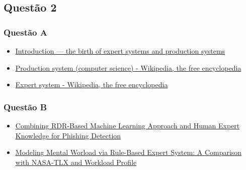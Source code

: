 \documentclass{article}
\begin{document}
    \subsection*{Questão 2}
    \subsubsection*{Questão A}
    \begin{itemize}
        \item \href{http://www.j-paine.org/students/tutorials/ps/node1.html}{Introduction --- the birth of expert systems and production systems}
        \item \href{https://en.wikipedia.org/wiki/Production_system_(computer_science)}{Production system (computer science) - Wikipedia, the free encyclopedia}
        \item \href{https://en.wikipedia.org/wiki/Expert_system}{Expert system - Wikipedia, the free encyclopedia}
    \end{itemize}
    
    \subsubsection*{Questão B}
    \begin{itemize}
        \item \href{https://books.google.com.br/books?id=GS7RDAAAQBAJ&lpg=PA80&dq=artificial%20intelligence%20expert%20system%202016&hl=pt-BR&pg=PA80#v=onepage&q=artificial%20intelligence%20expert%20system%202016&f=false}{Combining RDR-Based Machine Learning Approach and Human Expert Knowledge for Phishing Detection}
        \item \href{https://books.google.com.br/books?id=jYb2DAAAQBAJ&lpg=PA215&dq=artificial%20intelligence%20expert%20system%202016&hl=pt-BR&pg=PA215#v=onepage&q=artificial%20intelligence%20expert%20system%202016&f=false}{Modeling Mental Worload via Rule-Based Expert System: A Comparison with NASA-TLX and Workload Profile}
        
    \end{itemize}
\end{document}
